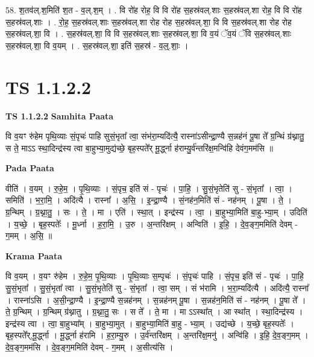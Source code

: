 \documentclass[17pt]{extarticle}
\begin{document}
58. श॒तव॑ल्.श॒मिति॑ श॒त - व॒ल्.श॒म् । . वि रो॑ह रोह॒ वि वि रो॑ह स॒हस्र॑वल्.शाः स॒हस्र॑वल्.शा रोह॒ वि वि रो॑ह स॒हस्र॑वल्.शाः । . रो॒ह॒ स॒हस्र॑वल्.शाः स॒हस्र॑वल्.शा रोह रोह स॒हस्र॑वल्.शा॒ वि वि स॒हस्र॑वल्.शा रोह रोह स॒हस्र॑वल्.शा॒ वि । . स॒हस्र॑वल्.शा॒ वि वि स॒हस्र॑वल्.शाः स॒हस्र॑वल्.शा॒ वि व॒यं ॅव॒यं ॅवि स॒हस्र॑वल्.शाः स॒हस्र॑वल्.शा॒ वि व॒यम् । . स॒हस्र॑वल्.शा॒ इति॑ स॒हस्र॑ - व॒ल्॒.शाः॒ । \newline
\pagebreak
{}

\section{ TS 1.1.2.2 }

\textbf{TS 1.1.2.2 } \newline
\textbf{Samhita Paata} \newline

वि व॒यꣳ रु॑हेम पृथि॒व्याः सं॒पृचः॑ पाहि सुसं॒भृता᳚ त्वा॒ संभ॑रा॒म्यदि॑त्यै॒ रास्ना॑ऽसीन्द्रा॒ण्यै स॒न्नह॑नं पू॒षा ते᳚ ग्र॒न्थिं ग्र॑थ्नातु॒ स ते॒ माऽऽ स्था॒दिन्द्र॑स्य त्वा बा॒हुभ्या॒मुद्य॑च्छे॒ बृह॒स्पते᳚र् मू॒र्द्ध्ना ह॑राम्यु॒र्व॑न्तरि॑क्ष॒मन्वि॑हि देवंग॒मम॑सि ॥ \newline

\textbf{Pada Paata} \newline

वीति॑ । व॒यम् । रु॒हे॒म॒ । पृ॒थि॒व्याः । सं॒पृच॒ इति॑ सं - पृचः॑ । पा॒हि॒ । सु॒सं॒भृतेति॑ सु - सं॒भृता᳚ । त्वा॒ । समिति॑ । भ॒रा॒मि॒ । अदि॑त्यै । रास्ना᳚ । अ॒सि॒ । इ॒न्द्रा॒ण्यै । सं॒नह॑न॒मिति॑ सं - नह॑नम् । पू॒षा । ते॒ । ग्र॒न्थिम् । ग्र॒थ्ना॒तु॒ । सः । ते॒ । मा । एति॑ । स्था॒त् । इन्द्र॑स्य । त्वा॒ । बा॒हुभ्या॒मिति॑ बा॒हु-भ्या॒म् । उदिति॑ । य॒च्छे॒ । बृह॒स्पतेः᳚ । मू॒र्ध्ना । ह॒रा॒मि॒ । उ॒रु । अ॒न्तरि॑क्षम् । अन्विति॑ । इ॒हि॒ । दे॒व॒ङ्ग॒ममिति॑ देवम् - ग॒मम् । अ॒सि॒ ॥  \newline


\textbf{Krama Paata} \newline

वि व॒यम् । व॒यꣳ रु॑हेम । रु॒हे॒म॒ पृ॒थि॒व्याः । पृ॒थि॒व्याः स॒म्पृचः॑ । सं॒पृचः॑ पाहि । सं॒पृच॒ इति॑ सं - पृचः॑ । पा॒हि॒ सु॒सं॒भृता᳚ । सु॒सं॒भृता᳚ त्वा । सु॒सं॒भृतेति॑ सु - सं॒भृता᳚ । त्वा॒ सम् । सं भ॑रामि । भ॒रा॒म्यदि॑त्यै । अदि॑त्यै॒ रास्ना᳚ । रास्ना॑ऽसि । अ॒सी॒न्द्रा॒ण्यै । इ॒न्द्रा॒ण्यै स॒न्नह॑नम् । स॒न्नह॑नम् पू॒षा । स॒न्नह॑न॒मिति॑ सं - नह॑नम् । पू॒षा ते᳚ । ते॒ ग्र॒न्थिम् । ग्र॒न्थिम् ग्र॑थ्नातु । ग्र॒थ्ना॒तु॒ सः । स ते᳚ । ते॒ मा । मा ऽऽस्था᳚त् । आ स्था᳚त् । स्था॒दिन्द्र॑स्य । इन्द्र॑स्य त्वा । त्वा॒ बा॒हुभ्या᳚म् । बा॒हुभ्या॒मुत् । बा॒हुभ्या॒मिति॑ बा॒हु - भ्या॒म् । उद्य॑च्छे । य॒च्छे॒ बृह॒स्पतेः᳚ । बृह॒स्पते᳚र्,मू॒र्द्ध्ना । मू॒र्द्ध्ना ह॑रामि । ह॒रा॒म्यु॒रु । उ॒र्व॑न्तरि॑क्षम् । अ॒न्तरि॑क्ष॒मनु॑ । अन्वि॑हि । इ॒हि॒ दे॒व॒ङ्ग॒मम् । दे॒व॒ङ्ग॒मम॑सि । दे॒व॒ङ्ग॒ममिति॑ देवम् - ग॒मम् । अ॒सीत्य॑सि । \newline
\end{document}
